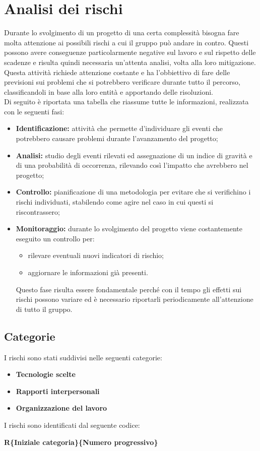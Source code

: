 \section{Analisi dei rischi}
Durante lo svolgimento di un progetto di una certa complessità bisogna fare molta attenzione ai possibili rischi a cui il gruppo può andare in contro. Questi possono avere conseguenze particolarmente negative sul lavoro e sul rispetto delle scadenze e risulta quindi necessaria un'attenta analisi, volta alla loro mitigazione.\\Questa attività richiede attenzione costante e ha l'obbiettivo di fare delle previsioni sui problemi che si potrebbero verificare durante tutto il percorso, classificandoli in base alla loro entità e apportando delle risoluzioni.\\
Di seguito è riportata una tabella che riassume tutte le informazioni, realizzata con le seguenti fasi:
\begin{itemize}
\item \textbf{Identificazione:} attività che permette d'individuare gli eventi che potrebbero causare problemi durante l'avanzamento del progetto;
\item \textbf{Analisi:} studio degli eventi rilevati ed assegnazione di un indice di gravità e di una probabilità di occorrenza, rilevando così l'impatto che avrebbero nel progetto;
\item \textbf{Controllo:} pianificazione di una metodologia per evitare che
si verifichino i rischi individuati, stabilendo come agire nel caso in cui questi si riscontrassero;
\item \textbf{Monitoraggio:} durante lo svolgimento del progetto viene costantemente eseguito un controllo per:
	\begin{itemize}
		\item rilevare eventuali nuovi indicatori di rischio;
		\item aggiornare le informazioni già presenti.
	\end{itemize}
Questo fase risulta essere fondamentale perché con il tempo gli effetti sui rischi possono variare ed è necessario riportarli periodicamente all'attenzione di tutto il gruppo.
\end{itemize}

\subsection{Categorie}
I rischi sono stati suddivisi nelle seguenti categorie:
\begin{itemize}
\item \textbf{Tecnologie scelte}
\item \textbf{Rapporti interpersonali}
\item \textbf{Organizzazione del lavoro}
\end{itemize}
I rischi sono identificati dal seguente codice:
\begin{center}
	\textbf{R\{Iniziale categoria\}\{Numero progressivo\}}
\end{center}

